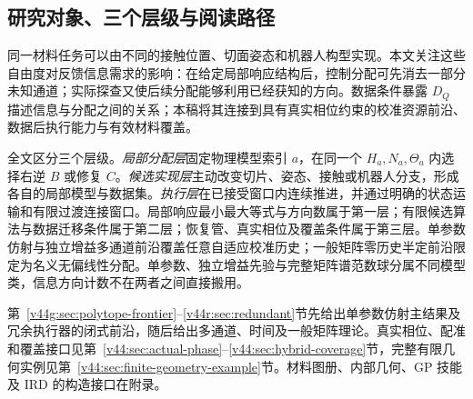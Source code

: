 \documentclass[11pt,a4paper]{article}
\numberwithin{equation}{section}
\theoremstyle{definition}
\begin{document}
\subsection{研究对象、三个层级与阅读路径}
同一材料任务可以由不同的接触位置、切面姿态和机器人构型实现。本文关注这些自由度对反馈信息需求的影响：在给定局部响应结构后，控制分配可先消去一部分未知通道；实际探查又使后续分配能够利用已经获知的方向。数据条件暴露 $D_Q$ 描述信息与分配之间的关系；本稿将其连接到具有真实相位约束的校准资源前沿、数据后执行能力与有效材料覆盖。

全文区分三个层级。\emph{局部分配层}固定物理模型索引 $a$，在同一个 $H_a,N_a,\Theta_a$ 内选择右逆 $B$ 或修复 $C$。\emph{候选实现层}主动改变切片、姿态、接触或机器人分支，形成各自的局部模型与数据集。\emph{执行层}在已接受窗口内连续推进，并通过明确的状态运输和有限过渡连接窗口。局部响应最小最大等式与方向数属于第一层；有限候选算法与数据迁移条件属于第二层；恢复管、真实相位及覆盖条件属于第三层。单参数仿射与独立增益多通道前沿覆盖任意自适应校准历史；一般矩阵零历史半定前沿限定为名义无偏线性分配。单参数、独立增益先验与完整矩阵谱范数球分属不同模型类，信息方向计数不在两者之间直接搬用。

第~\ref{v44g:sec:polytope-frontier}--\ref{v44r:sec:redundant}节先给出单参数仿射主结果及冗余执行器的闭式前沿，随后给出多通道、时间及一般矩阵理论。真实相位、配准和覆盖接口见第~\ref{v44:sec:actual-phase}--\ref{v44:sec:hybrid-coverage}节，完整有限几何实例见第~\ref{v44:sec:finite-geometry-example}节。材料图册、内部几何、GP 技能及 IRD 的构造接口在附录。
\end{document}
